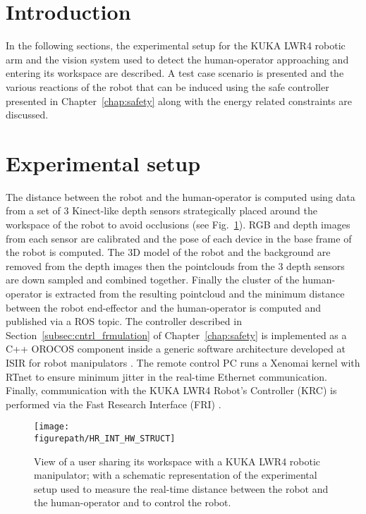 \section{Introduction}
\label{sec:experiment_on_kuka}
In the following sections, the experimental setup for the KUKA LWR4 robotic arm and the vision system used to detect the human-operator approaching and entering its workspace are described. A test case scenario is presented and the various reactions of the robot that can be induced using the safe controller presented in Chapter~\ref{chap:safety} along with the energy related constraints are discussed.
\section{Experimental setup}
The distance between the robot and the human-operator is computed using data from a set of 3 Kinect-like  depth sensors strategically placed around the workspace of the robot to avoid occlusions (see Fig.~\ref{fig:HR_INT_HW_STRUCT}). RGB and depth images from each sensor are calibrated and the pose of each device in the base frame of the robot is computed. The 3D model of the robot and the background  are removed from the depth images \cite{background_substraction} then  the pointclouds from the 3 depth sensors are down sampled and combined together. Finally the cluster of the human-operator is extracted from the resulting pointcloud \cite{PCL} and the minimum distance between the robot end-effector and the human-operator is computed and published via a ROS topic. The controller described in Section~\ref{subsec:cntrl_frmulation} of Chapter~\ref{chap:safety} is implemented as a C++ OROCOS \cite{rtt-url} component inside a generic software architecture developed at ISIR for robot manipulators  \cite{rtt-lwr-url}. The remote control PC runs a Xenomai kernel \cite{xenomai-url} with RTnet \cite{rtnet-url} to ensure minimum jitter in the real-time Ethernet communication. Finally, communication with the KUKA LWR4 Robot's Controller (KRC) is performed via the Fast Research Interface (FRI) \cite{schreiber2010fast}.
\begin{figure}
\centering
\captionsetup{width=.99\linewidth}\texttt{[image: \\figurepath/HR\_INT\_HW\_STRUCT]}
\caption{View of a user sharing its workspace with a KUKA LWR4 robotic manipulator; with a schematic representation of the experimental setup used to measure the real-time distance between the robot and the human-operator and to control the robot.}
\label{fig:HR_INT_HW_STRUCT}
\end{figure}
